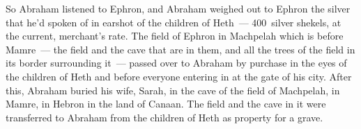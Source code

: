 \begin{inparaenum}
   So Abraham listened to Ephron, and Abraham weighed out to Ephron the silver that he'd spoken of in earshot of the children of Heth~--- 400~silver shekels, at the current, merchant's rate.%
   The field of Ephron in Machpelah which is before Mamre~--- the field and the cave that are in them, and all the trees of the field in its border surrounding it~--- passed over%
   to Abraham by purchase in the eyes of the children of Heth and before everyone entering in at the gate of his city.%
   After this, Abraham buried his wife, Sarah, in the cave of the field of Machpelah, in Mamre, in Hebron in the land of Canaan.%
   The field and the cave in it were transferred to Abraham from the children of Heth as property for a grave.%
\end{inparaenum}
